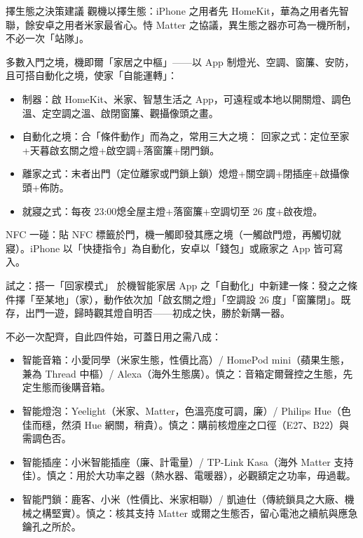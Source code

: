 \begin{tcbinfo}{擇生態之決策建議}
觀機以擇生態：iPhone 之用者先 HomeKit，華為之用者先智聯，餘安卓之用者米家最省心。恃 Matter 之協議，異生態之器亦可為一機所制，不必一次「站隊」。

\end{tcbinfo}


多數入門之境，機即爾「家居之中樞」——以 App 制燈光、空調、窗簾、安防，且可搭自動化之境，使家「自能運轉」：

\begin{itemize}
  \item 制器：啟 HomeKit、米家、智慧生活之 App，可遠程或本地以開關燈、調色溫、定空調之溫、啟閉窗簾、觀攝像頭之畫。
  \item 自動化之境：合「條件動作」而為之，常用三大之境： 回家之式：定位至家+天暮啟玄關之燈+啟空調+落窗簾+閉門鎖。
  \item 離家之式：末者出門（定位離家或門鎖上鎖）熄燈+關空調+閉插座+啟攝像頭+佈防。
  \item 就寢之式：每夜 23:00熄全屋主燈+落窗簾+空調切至 26 度+啟夜燈。
\end{itemize}

NFC 一碰：貼 NFC 標籤於門，機一觸即發其應之境（一觸啟門燈，再觸切就寢）。iPhone 以「快捷指令」為自動化，安卓以「錢包」或廠家之 App 皆可寫入。

\begin{tcbpractice}{試之：搭一「回家模式」}
於機智能家居 App 之「自動化」中新建一條：發之之條件擇「至某地」（家），動作依次加「啟玄關之燈」「空調設 26 度」「窗簾閉」。既存，出門一遊，歸時觀其燈自明否——初成之快，勝於新購一器。

\end{tcbpractice}


不必一次配齊，自此四件始，可蓋日用之需八成：

\begin{itemize}
  \item 智能音箱：小愛同學（米家生態，性價比高）/ HomePod mini（蘋果生態，兼為 Thread 中樞）/ Alexa（海外生態廣）。慎之：音箱定爾聲控之生態，先定生態而後購音箱。
  \item 智能燈泡：Yeelight（米家、Matter，色溫亮度可調，廉）/ Philips Hue（色佳而穩，然須 Hue 網關，稍貴）。慎之：購前核燈座之口徑（E27、B22）與需調色否。
  \item 智能插座：小米智能插座（廉、計電量）/ TP-Link Kasa（海外 Matter 支持佳）。慎之：用於大功率之器（熱水器、電暖器），必觀額定之功率，毋過載。
  \item 智能門鎖：鹿客、小米（性價比、米家相聯）/ 凱迪仕（傳統鎖具之大廠、機械之構堅實）。慎之：核其支持 Matter 或爾之生態否，留心電池之續航與應急鑰孔之所於。
\end{itemize}

